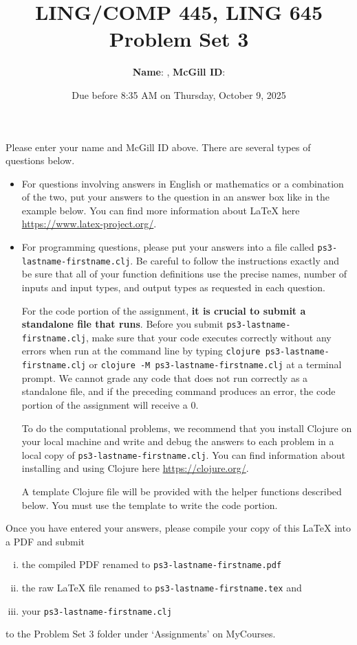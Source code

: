 \documentclass[10pt]{article}
\author{
  \textbf{Name}:       %
, \textbf{McGill ID}:  %
}
\newcommand{\PSnum}{3}
\begin{document}
\title{LING/COMP 445, LING 645\\Problem Set \PSnum}
\date{Due before 8:35 AM on Thursday, October 9, 2025}
\maketitle
Please enter your name and McGill ID above.
There are several types of questions below.
\begin{itemize}
\item
For questions involving answers in English or mathematics or a
combination of the two, put your answers to the question in an
answer box like in the example below. You can find more
information about \LaTeX{} here \url{https://www.latex-project.org/}.

\item For programming questions,
please put your answers into a file called
\texttt{ps\PSnum-lastname-firstname.clj}. Be careful to follow the instructions
exactly and be sure that all of your function definitions use the
precise names, number of inputs and input types, and output types as
requested in each question.

For the code portion of the assignment, \textbf{it is crucial to submit a
standalone file that runs}. Before you submit \texttt{ps\PSnum-lastname-firstname.clj},
make sure that your code executes correctly without any errors
when run at the command line by typing
\texttt{clojure ps\PSnum-lastname-firstname.clj} or \texttt{clojure -M ps\PSnum-lastname-firstname.clj} at a terminal
prompt. We cannot grade any code that does not run correctly as a
standalone file, and if the preceding command produces an error,
the code portion of the assignment will receive a $0$.

To do the computational problems, we recommend that you install
Clojure on your local machine and write and debug the answers to each
problem in a local copy of \texttt{ps\PSnum-lastname-firstname.clj}. You can
find information about installing and using Clojure here
\url{https://clojure.org/}.

A template Clojure file will be provided with the helper
functions described below. You must use the template to write the code portion.
\end{itemize}
Once you have entered your answers, please compile your copy of this
\LaTeX{} into a PDF and submit
\begin{enumerate}[(i),noitemsep]
\item
the compiled PDF renamed to
\texttt{ps\PSnum-lastname-firstname.pdf}
\item
the raw \LaTeX{} file renamed to
\texttt{ps\PSnum-lastname-firstname.tex} and
\item
your \texttt{ps\PSnum-lastname-firstname.clj}
\end{enumerate}
to the Problem Set \PSnum{} folder under `Assignments' on MyCourses.
\end{document}
